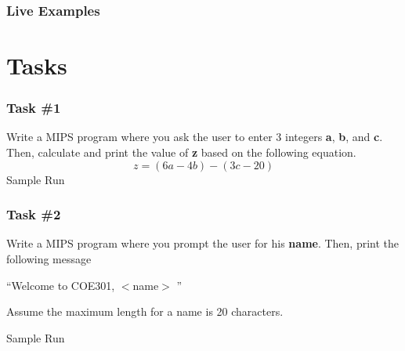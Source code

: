 \documentclass[
	11pt, %
	hmargin=1cm,vmargin=0cm,head=0.5cm,headsep=0pt,foot=0.5cm,margin=2cm
]{beamer}
\begin{document}
\begin{frame}
	\frametitle{Live Examples}
	
\end{frame}


\section{Tasks}

\begin{frame}
	\frametitle{Task \#1}
	Write a MIPS program where you ask the user to enter 3 integers \textbf{a}, \textbf{b}, and \textbf{c}. Then, calculate and print the value of \textbf{z} based on the following equation. 
	\begin{equation*}
		z = (6a - 4b) - (3c - 20)
	\end{equation*}
	\centering
	Sample Run


\end{frame}

\begin{frame}
	\frametitle{Task \#2}
	Write a MIPS program where you prompt the user for his \textbf{name}. Then, print the following message

	\centering
	\textquotedblleft Welcome to COE301, $<$name$>$ \textquotedblright

	\begin{flushleft}
		Assume the maximum length for a name is 20 characters.
	\end{flushleft}
	

	\centering
	Sample Run


\end{frame}

\end{document}
